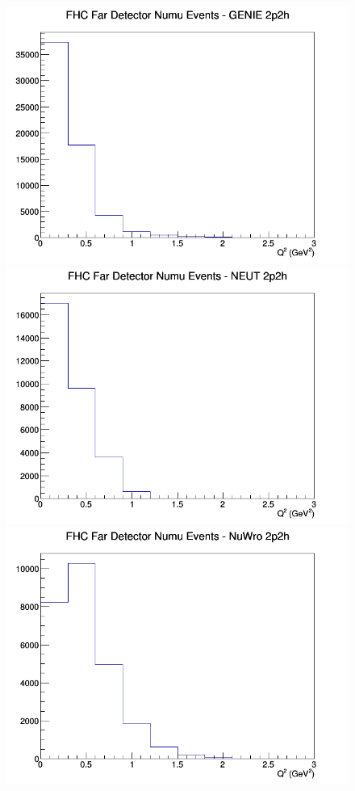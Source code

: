 \documentclass[12pt]{article}
\begin{document}
\begin{figure}[h]
\endminipage
\newline
{}
\includegraphics[width=\linewidth]{Q2/nominal/2p2h_FHC_FD_numu_Q2_GENIE.png}
\endminipage
{}
\includegraphics[width=\linewidth]{Q2/nominal/2p2h_FHC_FD_numu_Q2_NEUT.png}
\endminipage
{}
\includegraphics[width=\linewidth]{Q2/nominal/2p2h_FHC_FD_numu_Q2_NuWro.png}

\end{figure}
\end{document}
